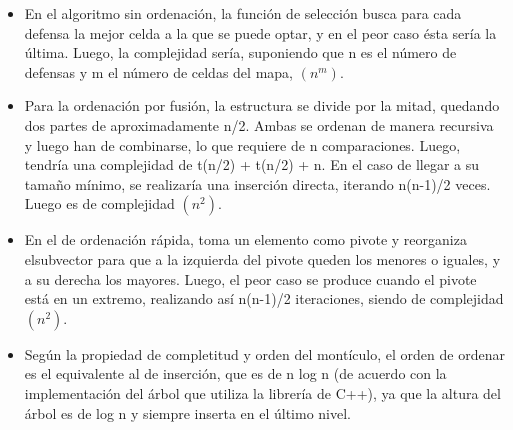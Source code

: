 \begin{itemize}
\item En el algoritmo sin ordenación, la función de selección busca para cada defensa la mejor celda a la que se puede optar, y en el peor caso ésta sería la última. Luego, la complejidad sería, suponiendo que n es el número de defensas y m el número de celdas del mapa, $(n^m)$. 
\item Para la ordenación por fusión, la estructura se divide por la mitad, quedando dos partes de aproximadamente n/2. Ambas se ordenan de manera recursiva y luego han de combinarse, lo que requiere de n comparaciones. Luego, tendría una complejidad de t(n/2) + t(n/2) + n. En el caso de llegar a su tamaño mínimo, se realizaría una inserción directa, iterando n(n-1)/2 veces. Luego es de complejidad $(n^2)$.
\item En el de ordenación rápida, toma un elemento como pivote y reorganiza elsubvector para que a la izquierda del pivote queden los menores o iguales, y a su derecha los mayores. Luego, el peor caso se produce cuando el pivote está en un extremo, realizando así n(n-1)/2 iteraciones, siendo de complejidad $(n^2)$.
\item Según la propiedad de completitud y orden del montículo, el orden de ordenar es el equivalente al de inserción, que es de n log n (de acuerdo con la implementación del árbol que utiliza la librería de C++), ya que la altura del árbol es de log n y siempre inserta en el último nivel.   
\end{itemize}

